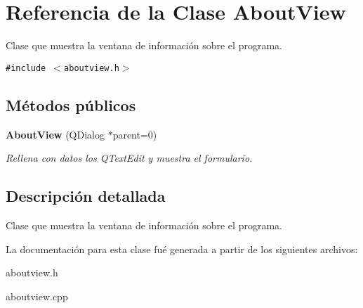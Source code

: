 \section{Referencia de la Clase About\-View}
\label{classAboutView}
Clase que muestra la ventana de informaci\'{o}n sobre el programa.  


{\tt \#include $<$aboutview.h$>$}

\subsection*{M\'{e}todos p\'{u}blicos}
\begin{CompactItemize}
\item 
{\bf About\-View} (QDialog $\ast$parent=0)\label{classAboutView_a0}

\begin{CompactList}\small\item\em Rellena con datos los QText\-Edit y muestra el formulario. \item\end{CompactList}\end{CompactItemize}


\subsection{Descripci\'{o}n detallada}
Clase que muestra la ventana de informaci\'{o}n sobre el programa. 



La documentaci\'{o}n para esta clase fu\'{e} generada a partir de los siguientes archivos:\begin{CompactItemize}
\item 
aboutview.h\item 
aboutview.cpp\end{CompactItemize}
